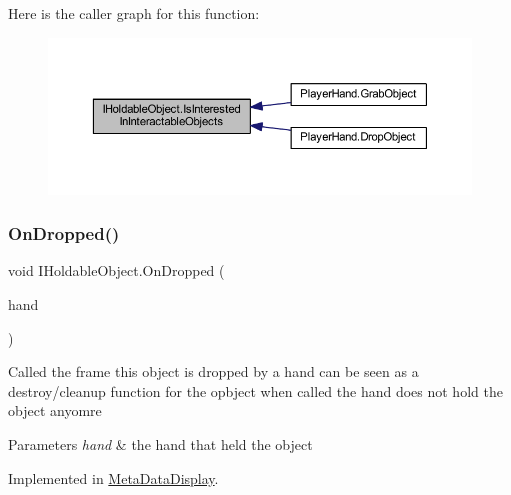 Here is the caller graph for this function\+:
\nopagebreak
\begin{figure}[H]
\begin{center}
\leavevmode
\includegraphics[width=350pt]{interface_i_holdable_object_a0356d534c17ab4e04fba00b42abeea77_icgraph}
\end{center}
\end{figure}
\mbox{\label{interface_i_holdable_object_a19523673c41505d8533aa50b957e95a1}} 
\subsubsection{\texorpdfstring{On\+Dropped()}{OnDropped()}}
{\footnotesize\ttfamily void I\+Holdable\+Object.\+On\+Dropped (\begin{DoxyParamCaption}\item[{\mbox{\hyperlink{class_player_hand}{Player\+Hand}}}]{hand }\end{DoxyParamCaption})}





Called the frame this object is dropped by a hand can be seen as a destroy/cleanup function for the opbject when called the hand does not hold the object anyomre 


\begin{DoxyParams}{Parameters}
{\em hand} & the hand that held the object\\
\hline
\end{DoxyParams}


Implemented in \mbox{\hyperlink{class_meta_data_display_a274478924e6a4df19484a469ae2869ce}{Meta\+Data\+Display}}.


